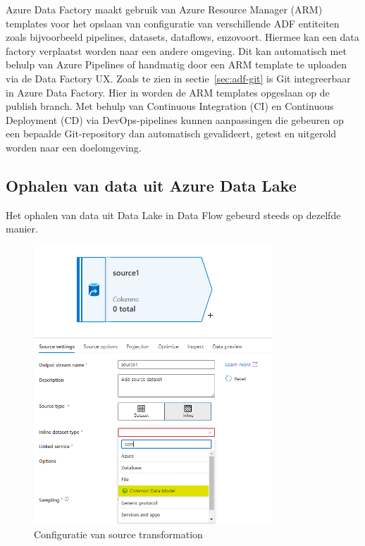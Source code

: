Azure Data Factory maakt gebruik van Azure Resource Manager (ARM) templates voor het opslaan van configuratie van verschillende ADF entiteiten zoals bijvoorbeeld pipelines, datasets, dataflows, enzovoort. Hiermee kan een data factory verplaatst worden naar een andere omgeving. Dit kan automatisch met behulp van Azure Pipelines of handmatig door een ARM template te uploaden via de Data Factory UX. Zoals te zien in sectie~\ref{sec:adf-git} is Git integreerbaar in Azure Data Factory. Hier in worden de ARM templates opgeslaan op de publish branch. Met behulp van Continuous Integration (CI) en Continuous Deployment (CD) via DevOps-pipelines kunnen aanpassingen die gebeuren op een bepaalde Git-repository dan automatisch gevalideert, getest en uitgerold worden naar een doelomgeving.

\subsection{Ophalen van data uit Azure Data Lake}

Het ophalen van data uit Data Lake in Data Flow gebeurd steeds op dezelfde manier. 

\begin{figure}[H]
    \centering
    \includegraphics[width=0.8\textwidth]{./graphics/adf/source_table_1_specific.png}
    \caption{Configuratie van source transformation}
\end{figure}

